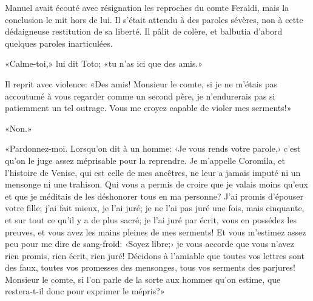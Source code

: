 
Manuel avait écouté avec résignation les reproches du comte Feraldi, mais la conclusion le mit hors de lui. Il s'était attendu à des paroles sévères, non à cette dédaigneuse restitution de sa liberté. Il pâlit de colère, et balbutia d'abord quelques paroles inarticulées.

«Calme-toi,» lui dit Toto; «tu n'as ici que des amis.»

Il reprit avec violence: «Des amis! Monsieur le comte, si je ne m'étais pas accoutumé à vous regarder comme un second père, je n'endurerais pas si patiemment un tel outrage. Vous me croyez capable de violer mes serments!»

«Non.»

«Pardonnez-moi. Lorsqu'on dit à un homme: ‹Je vous rends votre parole,› c'est qu'on le juge assez méprisable pour la reprendre. Je m'appelle Coromila, et l'histoire de Venise, qui est celle de mes ancêtres, ne leur a jamais imputé ni un mensonge ni une trahison. Qui vous a permis de croire que je valais moins qu'eux et que je méditais de les déshonorer tous en ma personne? J'ai promis d'épouser votre fille; j'ai fait mieux, je l'ai juré; je ne l'ai pas juré une fois, mais cinquante, et sur tout ce qu'il y a de plus sacré; je l'ai juré par écrit, vous en possédez les preuves, et vous avez les mains pleines de mes serments! Et vous m'estimez assez peu pour me dire de sang-froid: ‹Soyez libre;› je vous accorde que vous n'avez rien promis, rien écrit, rien juré! Décidons à l'amiable que toutes vos lettres sont des faux, toutes vos promesses des mensonges, tous vos serments des parjures! Monsieur le comte, si l'on parle de la sorte aux hommes qu'on estime, que restera-t-il donc pour exprimer le mépris?»

\enlargethispage{\baselineskip}

